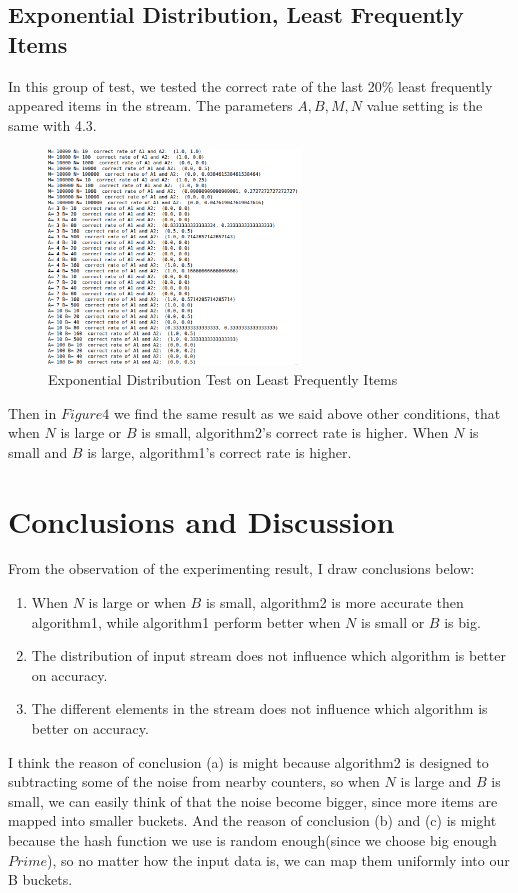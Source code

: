 \documentclass{article}
\begin{document}
\subsection{Exponential Distribution, Least Frequently Items}
In this group of test, we tested the correct rate of the last 20\% least frequently appeared items in the stream. The parameters $A, B, M, N$ value setting is the same with 4.3.
\begin{figure}[h]
\begin{center}
\includegraphics[width=0.6\textwidth]{ExpLeast} 
\caption{Exponential Distribution Test on Least Frequently Items}
\end{center}
\end{figure}
Then in $Figure 4$ we find the same result as we said above other conditions, that when $N$ is large or $B$ is small, algorithm2's correct rate is higher. When $N$ is small and $B$ is large, algorithm1's correct rate is higher. 

\section{Conclusions and Discussion}
From the observation of the experimenting result, I draw conclusions below:
\begin{enumerate}
\item When $N$ is large or when $B$ is small, algorithm2 is more accurate then algorithm1, while algorithm1 perform better when $N$ is small or $B$ is big.
\item The distribution of input stream does not influence which algorithm is better on accuracy.
\item The different elements in the stream does not influence which algorithm is better on accuracy.
\end{enumerate}

I think the reason of conclusion (a) is might because algorithm2 is designed to subtracting some of the noise from nearby counters, so when $N$ is large and $B$ is small, we can easily think of that the noise become bigger, since more items are mapped into smaller buckets.
\newline
\newline
And the reason of conclusion (b) and (c) is might because the hash function we use is random enough(since we choose big enough $Prime$), so no matter how the input data is, we can map them uniformly into our B buckets.  
\end{document}
